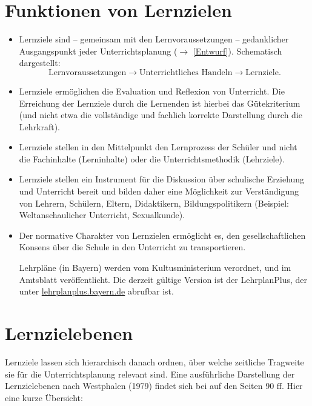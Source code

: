\section{Funktionen von Lernzielen}
\begin{itemize}
	\item Lernziele sind -- gemeinsam mit den Lernvoraussetzungen -- gedanklicher Ausgangspunkt jeder Unterrichtsplanung ($\to$ \cref{Entwurf}). Schematisch dargestellt: \begin{equation*}
		\text{Lernvoraussetzungen} \longrightarrow \text{Unterrichtliches Handeln} \longrightarrow \text{Lernziele.}
	\end{equation*}
	\item Lernziele ermöglichen die Evaluation und Reflexion von Unterricht. Die Erreichung der Lernziele durch die Lernenden ist hierbei das Gütekriterium (und nicht etwa die vollständige und fachlich korrekte Darstellung durch die Lehrkraft).
	\item Lernziele stellen in den Mittelpunkt den Lernprozess der
	Sch\"{u}ler und nicht die Fachinhalte (Lerninhalte) oder
	die Unterrichtsmethodik (Lehrziele).
	\item
	Lernziele stellen ein Instrument f\"{u}r die Diskussion \"{u}ber
	schulische Erziehung und Unterricht bereit und bilden
	daher eine M\"{o}glichkeit zur Verst\"{a}ndigung von Lehrern,
	Sch\"{u}lern, Eltern, Didaktikern, Bildungspolitikern
	(Beispiel: Weltanschaulicher Unterricht, Sexualkunde).
	\item
	Der normative Charakter von Lernzielen erm\"{o}glicht es, den
	gesellschaftlichen Konsens \"{u}ber die Schule in den Unterricht zu
	transportieren.
	
	\mip
	Lehrpl\"{a}ne (in Bayern) werden vom Kultusministerium verordnet,
	und im Amtsblatt ver\"{o}ffentlicht. Die derzeit gültige Version ist der LehrplanPlus, der unter \url{lehrplanplus.bayern.de} abrufbar ist.
\end{itemize}

\section{Lernzielebenen}

Lernziele lassen sich hierarchisch danach ordnen, über welche zeitliche Tragweite sie für die Unterrichtsplanung relevant sind. Eine ausführliche Darstellung der Lernzielebenen nach Westphalen (1979) findet sich bei \textcite{KircherGirwidzHaussler1} auf den Seiten 90 ff. Hier eine kurze Übersicht:

